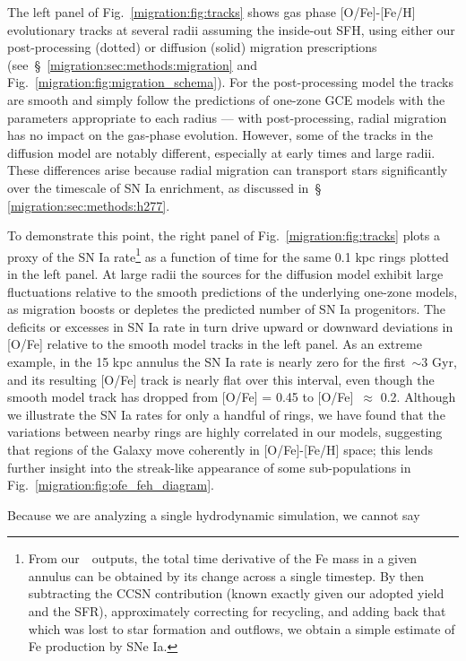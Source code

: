 The left panel of Fig.~\ref{migration:fig:tracks} shows gas phase [O/Fe]-[Fe/H] 
evolutionary tracks at several radii assuming the inside-out SFH, using either 
our post-processing (dotted) or diffusion (solid) migration prescriptions 
(see~\S~\ref{migration:sec:methods:migration} and Fig.~\ref{migration:fig:migration_schema}). 
For the post-processing model the tracks are smooth and simply follow the 
predictions of one-zone GCE models with the parameters appropriate to each 
radius --- with post-processing, radial migration has no impact on the gas-phase 
evolution. 
However, some of the tracks in the diffusion model are notably 
different, especially at early times and large radii. 
These differences arise because radial migration can transport stars 
significantly over the timescale of SN Ia enrichment, as discussed in~\S 
\ref{migration:sec:methods:h277}.
\par 
To demonstrate this point, the right panel of Fig.~\ref{migration:fig:tracks} plots a 
proxy of the SN Ia rate\footnote{
	From our~\vice~outputs, the total time derivative of the Fe mass in a given 
	annulus can be obtained by its change across a single timestep. By then 
	subtracting the CCSN contribution (known exactly given our adopted yield 
	and the SFR), approximately correcting for recycling, and adding back that 
	which was lost to star formation and outflows, we obtain a simple estimate 
	of Fe production by SNe Ia. 
} as a function of time for the same 0.1 kpc rings plotted in the left panel. 
At large radii the sources for the diffusion model exhibit large fluctuations 
relative to the smooth predictions of the underlying one-zone models, as 
migration boosts or depletes the predicted number of SN Ia progenitors. 
The deficits or excesses in SN Ia rate in turn drive upward or downward 
deviations in [O/Fe] relative to the smooth model tracks in the left panel. 
As an extreme example, in the 15 kpc annulus the SN Ia rate is nearly zero for 
the first~$\sim$3 Gyr, and its resulting [O/Fe] track is nearly flat over this 
interval, even though the smooth model track has dropped from [O/Fe] = 0.45 to 
[O/Fe]~$\approx$ 0.2. 
Although we illustrate the SN Ia rates for only a handful of rings, we have 
found that the variations between nearby rings are highly correlated in our 
models, suggesting that regions of the Galaxy move coherently in 
[O/Fe]-[Fe/H] space; this lends further insight into the streak-like appearance 
of some sub-populations in Fig.~\ref{migration:fig:ofe_feh_diagram}. 
\par 
Because we are analyzing a single hydrodynamic simulation, we cannot say 
